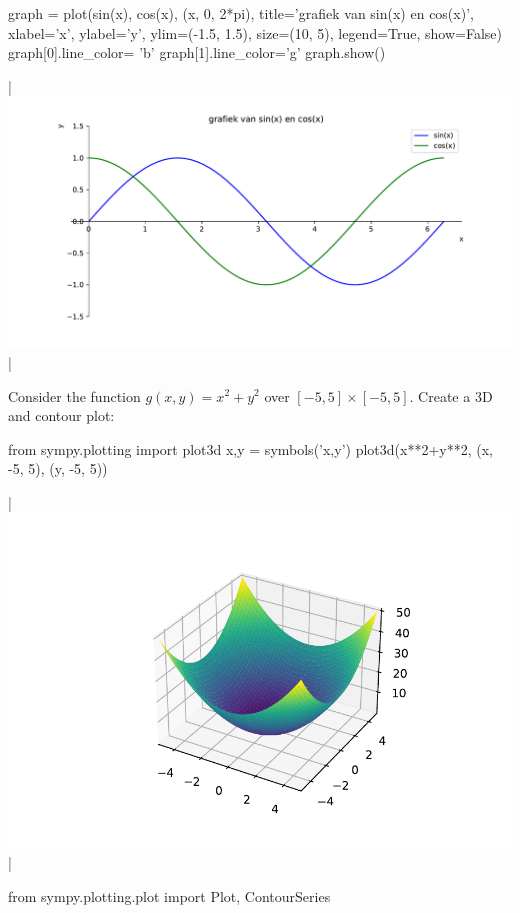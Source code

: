 \begin{example}
\begin{pyin}
    graph = plot(sin(x), cos(x), (x, 0, 2*pi), title='grafiek van sin(x) en cos(x)',
    xlabel='x', ylabel='y', ylim=(-1.5, 1.5), size=(10, 5), legend=True, show=False)
    graph[0].line_color= 'b'
    graph[1].line_color='g'
    graph.show()
\end{pyin}
\begin{pyout}
    |\includegraphics{figures/Sympy/fig_sympy_3.pdf}|
\end{pyout}

	Consider the function $g(x,y) = x^2+y^2$ over $[-5,5]\times[-5,5]$. Create a 3D and contour plot:
\begin{pyin}
    from sympy.plotting import plot3d
    x,y = symbols('x,y')
    plot3d(x**2+y**2, (x, -5, 5), (y, -5, 5))
\end{pyin}
\begin{pyout}
    |\includegraphics{figures/Sympy/fig_sympy_4.pdf}|
\end{pyout}

\begin{pyin}
    from sympy.plotting.plot import Plot, ContourSeries
    

\end{pyin}
\end{example}
